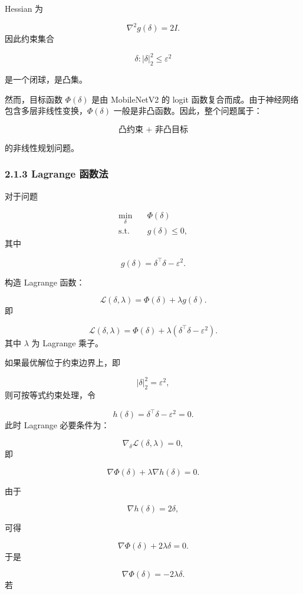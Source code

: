 ﻿\documentclass[UTF8,zihao=-4,fontset=none]{ctexart}
\begin{document}
Hessian 为

\[
\nabla^2 g(\delta)=2I.
\]
\noindent 因此约束集合

\[
{\delta:|\delta|_2^2\le \varepsilon^2}
\]

是一个闭球，是凸集。

然而，目标函数 \(\Phi(\delta)\) 是由 MobileNetV2 的 logit 函数复合而成。由于神经网络包含多层非线性变换，\(\Phi(\delta)\) 一般是非凸函数。因此，整个问题属于：

\[
\text{凸约束 + 非凸目标}
\]

的非线性规划问题。

\subsubsection*{2.1.3 Lagrange 函数法}
{}

对于问题

\[
\begin{aligned}
\min_{\delta}
\quad & \Phi(\delta)\\
\mathrm{s.t.}
\quad & g(\delta)\le 0,
\end{aligned}
\]
\noindent 其中

\[
g(\delta)=\delta^\top\delta-\varepsilon^2.
\]

构造 Lagrange 函数：

\[
\mathcal{L}(\delta,\lambda)
=
\Phi(\delta)
+
\lambda g(\delta).
\]
\noindent 即

\[
\mathcal{L}(\delta,\lambda)
=
\Phi(\delta)
+
\lambda(\delta^\top\delta-\varepsilon^2).
\]
\noindent 其中 \(\lambda\) 为 Lagrange 乘子。

如果最优解位于约束边界上，即

\[
|\delta|_2^2=\varepsilon^2,
\]
\noindent 则可按等式约束处理，令

\[
h(\delta)=\delta^\top\delta-\varepsilon^2=0.
\]
\noindent 此时 Lagrange 必要条件为：

\[
\nabla_\delta \mathcal{L}(\delta,\lambda)=0,
\]
\noindent 即

\[
\nabla \Phi(\delta)+\lambda \nabla h(\delta)=0.
\]

由于

\[
\nabla h(\delta)=2\delta,
\]

可得

\[
\nabla \Phi(\delta)+2\lambda\delta=0.
\]
\noindent 于是

\[
\nabla \Phi(\delta)=-2\lambda\delta.
\]
\noindent 若
\end{document}
